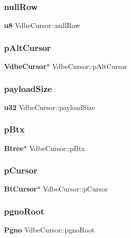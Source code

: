 \mbox{\label{struct_vdbe_cursor_a564d1df8b7bf6df90b1c07c97d7b23ff}} 
\subsubsection{nullRow}
{\footnotesize\ttfamily \textbf{ u8} Vdbe\+Cursor\+::null\+Row}

\mbox{\label{struct_vdbe_cursor_acc57fe0cffe660d0d08ac422dfa20af5}} 
\subsubsection{pAltCursor}
{\footnotesize\ttfamily \textbf{ Vdbe\+Cursor}$\ast$ Vdbe\+Cursor\+::p\+Alt\+Cursor}

\mbox{\label{struct_vdbe_cursor_a92f39b19e82152386e20ede96d177058}} 
\subsubsection{payloadSize}
{\footnotesize\ttfamily \textbf{ u32} Vdbe\+Cursor\+::payload\+Size}

\mbox{\label{struct_vdbe_cursor_a560873e698d4c6e7d032c069f16834fa}} 
\subsubsection{pBtx}
{\footnotesize\ttfamily \textbf{ Btree}$\ast$ Vdbe\+Cursor\+::p\+Btx}

\mbox{\label{struct_vdbe_cursor_a9ecb4ab9f7374f92da69f03fc336c293}} 
\subsubsection{pCursor}
{\footnotesize\ttfamily \textbf{ Bt\+Cursor}$\ast$ Vdbe\+Cursor\+::p\+Cursor}

\mbox{\label{struct_vdbe_cursor_aaff39caaa6bada9b2cd27dbc1fd2a5fc}} 
\subsubsection{pgnoRoot}
{\footnotesize\ttfamily \textbf{ Pgno} Vdbe\+Cursor\+::pgno\+Root}

